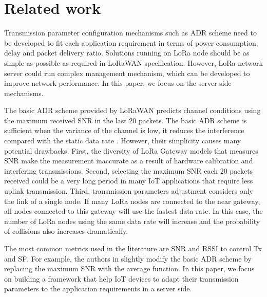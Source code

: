 \section{Related work} \label{sec:Related work}

Transmission parameter configuration mechanisms such as \ac{ADR} scheme need to be developed to fit each application requirement in terms of power consumption,
	delay and packet delivery ratio.
Solutions running on LoRa node should be as simple as possible as required in LoRaWAN specification.
However,
	LoRa network server could run complex management mechanism,
	which can be developed to improve network performance.
In this paper, 
	we focus on the server-side mechanisms.

The basic \ac{ADR} scheme \cite{LorawanSpecification} provided by LoRaWAN predicts channel conditions using the maximum received \ac{SNR} in the last 20 packets.
The basic \ac{ADR} scheme is sufficient when the variance of the channel is low, 
	it reduces the interference compared with the static data rate \cite{bor_lora_2016}\cite{slabicki_adaptive_2018}.
However,
	their simplicity causes many potential drawbacks.
First,
	the diversity of LoRa Gateway models that measures \ac{SNR} make the measurement inaccurate as a result of hardware calibration and interfering transmissions.
Second,
	selecting the maximum \ac{SNR} each 20 packets received could be a very long period in many IoT applications that require less uplink transmission.
Third,
	transmission parameters adjustment considers only the link of a single node.
If many LoRa nodes are connected to the near gateway,
	all nodes connected to this gateway will use the fastest data rate.
In this case,
	the number of LoRa nodes using the same data rate will increase and the probability of collisions also increases dramatically.

The most common metrics used in the literature are \ac{SNR} and \ac{RSSI} to control \ac{Tx} and \ac{SF}.
For example,
	the authors in \cite{slabicki_adaptive_2018} slightly modify the basic \ac{ADR} scheme by replacing the maximum \ac{SNR} with the average function.
In this paper,
	we focus on building a framework that help IoT devices to adapt their transmission parameters to the application requirements in a server side.

